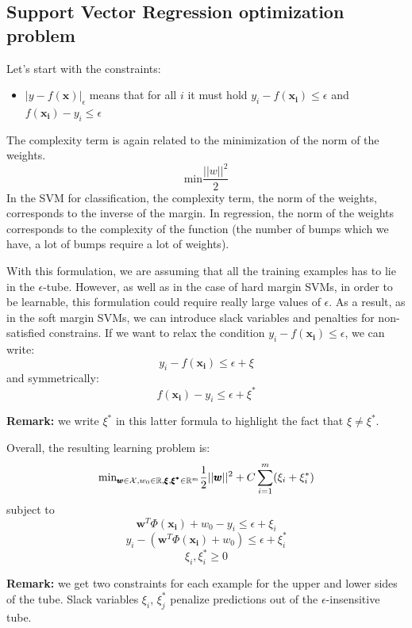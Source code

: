 \subsection{Support Vector Regression optimization problem}
Let's start with the constraints:
\begin{itemize}
    \item $|y-f(\pmb{x})|_\epsilon$ means that for all $i$ it must hold $y_i - f(\pmb{x_i}) \leq \epsilon$ and $f(\pmb{x_i}) - y_i \leq \epsilon$
\end{itemize}

The complexity term is again related to the minimization of the norm of the weights.
$$\text{min} \frac{||w||^2}{2}$$
In the SVM for classification, the complexity term, the norm of the weights, corresponds to the inverse of the margin. In regression, the norm of the weights corresponds to the complexity of the function (the number of bumps which we have, a lot of bumps require a lot of weights). \newline

With this formulation, we are assuming that all the training examples has to lie in the $\epsilon$-tube. However, as well as in the case of hard margin SVMs, in order to be learnable, this formulation could require really large values of $\epsilon$. As a result, as in the soft margin SVMs, we can introduce slack variables and penalties for non-satisfied constrains. If we want to relax the condition $y_i - f(\pmb{x_i}) \leq \epsilon$, we can write:
$$y_i - f(\pmb{x_i}) \leq \epsilon + \xi$$ and symmetrically: $$f(\pmb{x_i}) - y_i \leq \epsilon + \xi^*$$

\textbf{Remark:} we write $\xi^*$ in this latter formula to highlight the fact that $\xi \neq \xi^*$. \newline

Overall, the resulting learning problem is:
\begin{equation}
    \text{min}_{\pmb{w} \in \mathcal{X}, w_0 \in \mathbb{R}, \pmb{\xi}, \pmb{\xi^*} \in \mathbb{R}^m} \frac{1}{2} ||\pmb{w}||^2 + C \sum_{i=1}^m (\xi_i + \xi_i^*) \end{equation}
    subject to
    $$\pmb{w}^T \Phi(\pmb{x_i}) + w_0 - y_i \leq \epsilon + \xi_i$$
    $$y_i - (\pmb{w}^T \Phi(\pmb{x_i})+w_0) \leq \epsilon + \xi_i^*$$
    $$\xi_i , \xi_i^* \geq 0$$

\textbf{Remark:} we get two constraints for each example for the upper and lower sides of the tube. Slack variables $\xi_i$, $\xi_j^*$ penalize predictions out of the $\epsilon$-insensitive tube. \newline

